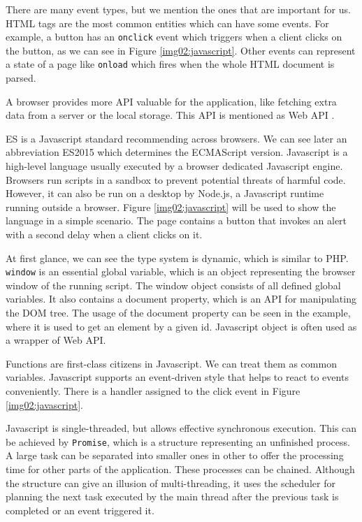 There are many event types, but we mention the ones that are important for us.
HTML tags are the most common entities which can have some events.
For example, a button has an \texttt{onclick} event which triggers when a client clicks on the button, as we can see in Figure \ref{img02:javascript}. 
Other events can represent a state of a page like \texttt{onload} which fires when the whole HTML document is parsed.
\par
A browser provides more API valuable for the application, like fetching extra data from a server or the local storage.
This API is mentioned as Web API \cite{online:webApi}.
\par
\ac{ES} is a Javascript standard recommending across browsers.
We can see later an abbreviation ES2015 which determines the ECMAScript version.
Javascript is a high-level language usually executed by a browser dedicated Javascript engine.
Browsers run scripts in a sandbox to prevent potential threats of harmful code.
However, it can also be run on a desktop by Node.js, a Javascript runtime running outside a browser.
Figure \ref{img02:javascript} will be used to show the language in a simple scenario.
The page contains a button that invokes an alert with a second delay when a client clicks on it.
\par
At first glance, we can see the type system is dynamic, which is similar to PHP.
\texttt{window} is an essential global variable, which is an object representing the browser window of the running script.
The window object consists of all defined global variables.
It also contains a document property, which is an API for manipulating the DOM tree.
The usage of the document property can be seen in the example, where it is used to get an element by a given id.
Javascript object is often used as a wrapper of Web API.
\par
Functions are first-class citizens in Javascript.
We can treat them as common variables.
Javascript supports an event-driven style that helps to react to events conveniently.
There is a handler assigned to the click event in Figure \ref{img02:javascript}.
\par
Javascript is single-threaded, but allows effective synchronous execution.
This can be achieved by \texttt{Promise}, which is a structure representing an unfinished process.
A large task can be separated into smaller ones in other to offer the processing time for other parts of the application.
These processes can be chained.
Although the structure can give an illusion of multi-threading, it uses the scheduler for planning the next task executed by the main thread after the previous task is completed or an event triggered it.
